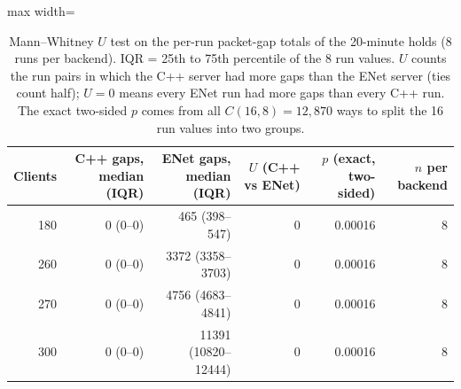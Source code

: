 \IfFileExists{IEEEtran.cls}{\ieeetrue\documentclass[conference]{IEEEtran}}{\ieeefalse\documentclass[twocolumn,10pt]{article}}
\begin{document}
\begin{table}[H]
\caption{Mann--Whitney $U$ test on the per-run packet-gap totals of the 20-minute holds (8 runs per backend). IQR = 25th to 75th percentile of the 8 run values. $U$ counts the run pairs in which the C++ server had more gaps than the ENet server (ties count half); $U=0$ means every ENet run had more gaps than every C++ run. The exact two-sided $p$ comes from all $C(16,8)=12{,}870$ ways to split the 16 run values into two groups.}
\label{tab:mwu}
\centering
\footnotesize
\setlength{\tabcolsep}{3pt}
\begin{adjustbox}{max width=\columnwidth}\begin{tabular}{@{}rrrrrr@{}}
\toprule
Clients & C++ gaps, median (IQR) & ENet gaps, median (IQR) & $U$ (C++ vs ENet) & $p$ (exact, two-sided) & $n$ per backend \\
\midrule
180 & 0 (0--0) & 465 (398--547) & 0 & 0.00016 & 8 \\
260 & 0 (0--0) & 3372 (3358--3703) & 0 & 0.00016 & 8 \\
270 & 0 (0--0) & 4756 (4683--4841) & 0 & 0.00016 & 8 \\
300 & 0 (0--0) & 11391 (10820--12444) & 0 & 0.00016 & 8 \\
\bottomrule
\end{tabular}\end{adjustbox}
\end{table}
\end{document}
